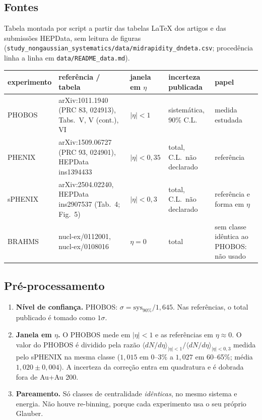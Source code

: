 \documentclass[11pt,a4paper]{article}
\newcommand{\arq}[1]{\texttt{\nolinkurl{#1}}}
\begin{document}
\subsection{Fontes}
Tabela montada por script a partir das tabelas LaTeX dos artigos e das submissões HEPData, sem leitura de figuras
(\arq{study_nongaussian_systematics/data/midrapidity_dndeta.csv}; procedência linha a linha em \arq{data/README_data.md}).

\begin{center}\footnotesize
\begin{tabularx}{\linewidth}{@{}l >{\raggedright\arraybackslash}p{5.2cm} l Y Y@{}}
\toprule
experimento & referência / tabela & janela em $\eta$ & incerteza publicada & papel \\
\midrule
PHOBOS & arXiv:1011.1940 (PRC 83, 024913), Tabs.\ V, V (cont.), VI & $|\eta|<1$ & sistemática, 90\% C.L. & medida estudada \\
PHENIX & arXiv:1509.06727 (PRC 93, 024901), HEPData ins1394433 & $|\eta|<0{,}35$ & total, C.L.\ não declarado & referência \\
sPHENIX & arXiv:2504.02240, HEPData ins2907537 (Tab.\ 4; Fig.\ 5) & $|\eta|<0{,}3$ & total, C.L.\ não declarado & referência e forma em $\eta$ \\
BRAHMS & nucl-ex/0112001, nucl-ex/0108016 & $\eta=0$ & total & sem classe idêntica ao PHOBOS: não usado \\
\bottomrule
\end{tabularx}
\end{center}

\subsection{Pré-processamento}
\begin{enumerate}[nosep]
\item \textbf{Nível de confiança.} PHOBOS: $\sigma=\mathrm{sys}_{90\%}/1{,}645$. Nas referências, o total publicado é tomado como $1\sigma$.
\item \textbf{Janela em $\eta$.} O PHOBOS mede em $|\eta|<1$ e as referências em $\eta\approx0$. O valor do PHOBOS é dividido
pela razão $\langle dN/d\eta\rangle_{|\eta|<1}/\langle dN/d\eta\rangle_{|\eta|<0,3}$ medida pelo sPHENIX na mesma classe
($1{,}015$ em 0--3\% a $1{,}027$ em 60--65\%; média $1{,}020\pm0{,}004$). A incerteza da correção entra em quadratura e é dobrada
fora de Au+Au 200.
\item \textbf{Pareamento.} Só classes de centralidade \emph{idênticas}, no mesmo sistema e energia. Não houve
re-binning, porque cada experimento usa o seu próprio Glauber.
\end{enumerate}
\end{document}
